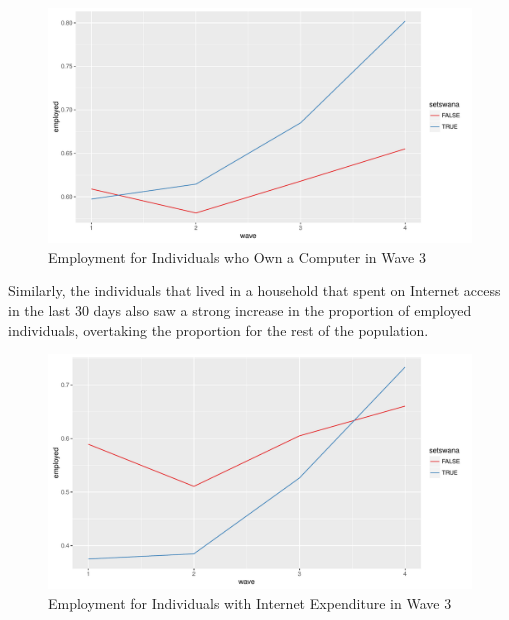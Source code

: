 \documentclass[a4paper,british]{article}\usepackage[]{graphicx}\usepackage[]{color}
\makeatletter
\def\maxwidth{ %
  \ifdim\Gin@nat@width>\linewidth
    \linewidth
  \else
    \Gin@nat@width
  \fi
}
\newenvironment{knitrout}{}{} %
\makeatother
\begin{document}
\begin{figure}[H]
\caption{Employment for Individuals who Own a Computer in Wave 3}



\begin{knitrout}
\color{fgcolor}
\includegraphics[width=\maxwidth]{../Making-Next-Billion-Demand-Access/misc/latex-employment_own_computer-1} 

\end{knitrout}
\end{figure}

Similarly, the individuals that lived in a household that spent on
Internet access in the last 30 days also saw a strong increase in
the proportion of employed individuals, overtaking the proportion
for the rest of the population.

\begin{figure}[H]
\caption{Employment for Individuals with Internet Expenditure in Wave 3}

\begin{knitrout}
\color{fgcolor}
\includegraphics[width=\maxwidth]{../Making-Next-Billion-Demand-Access/misc/latex-employment_Int_exp-1} 

\end{knitrout}


\end{figure}
\end{document}
